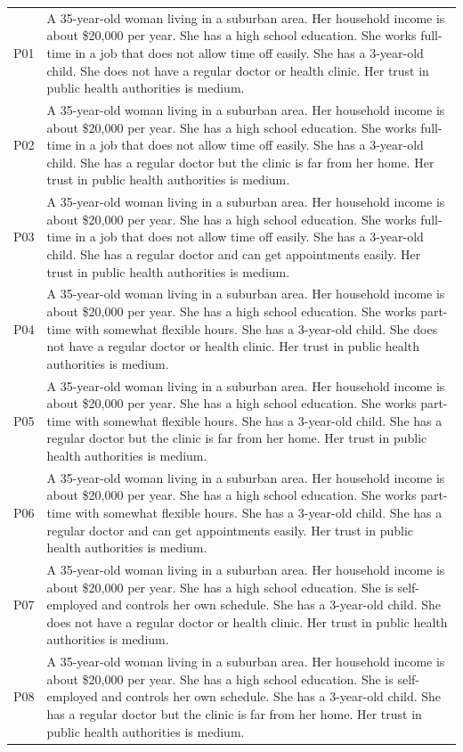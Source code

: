 \begin{longtable}{p{1.2cm}p{12cm}}
P01 & A 35-year-old woman living in a suburban area. Her household income is about \$20,000 per year. She has a high school education. She works full-time in a job that does not allow time off easily. She has a 3-year-old child. She does not have a regular doctor or health clinic. Her trust in public health authorities is medium. \\
P02 & A 35-year-old woman living in a suburban area. Her household income is about \$20,000 per year. She has a high school education. She works full-time in a job that does not allow time off easily. She has a 3-year-old child. She has a regular doctor but the clinic is far from her home. Her trust in public health authorities is medium. \\
P03 & A 35-year-old woman living in a suburban area. Her household income is about \$20,000 per year. She has a high school education. She works full-time in a job that does not allow time off easily. She has a 3-year-old child. She has a regular doctor and can get appointments easily. Her trust in public health authorities is medium. \\
P04 & A 35-year-old woman living in a suburban area. Her household income is about \$20,000 per year. She has a high school education. She works part-time with somewhat flexible hours. She has a 3-year-old child. She does not have a regular doctor or health clinic. Her trust in public health authorities is medium. \\
P05 & A 35-year-old woman living in a suburban area. Her household income is about \$20,000 per year. She has a high school education. She works part-time with somewhat flexible hours. She has a 3-year-old child. She has a regular doctor but the clinic is far from her home. Her trust in public health authorities is medium. \\
P06 & A 35-year-old woman living in a suburban area. Her household income is about \$20,000 per year. She has a high school education. She works part-time with somewhat flexible hours. She has a 3-year-old child. She has a regular doctor and can get appointments easily. Her trust in public health authorities is medium. \\
P07 & A 35-year-old woman living in a suburban area. Her household income is about \$20,000 per year. She has a high school education. She is self-employed and controls her own schedule. She has a 3-year-old child. She does not have a regular doctor or health clinic. Her trust in public health authorities is medium. \\
P08 & A 35-year-old woman living in a suburban area. Her household income is about \$20,000 per year. She has a high school education. She is self-employed and controls her own schedule. She has a 3-year-old child. She has a regular doctor but the clinic is far from her home. Her trust in public health authorities is medium. \\

\end{longtable}
